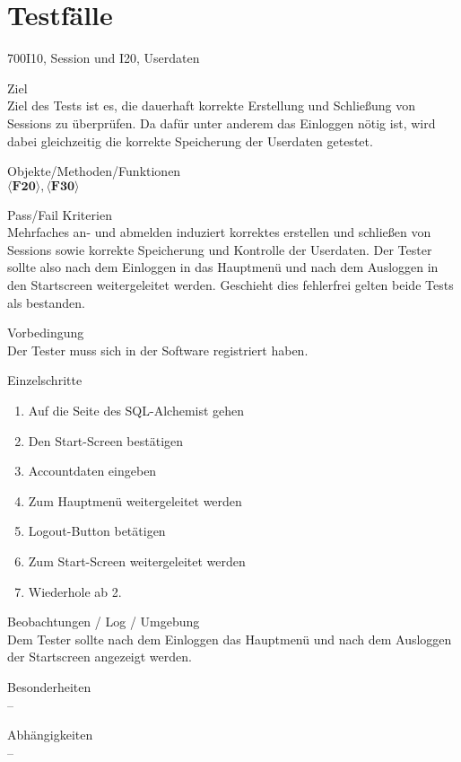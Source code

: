\section{Testfälle}
\begin{testcase}{700}{I10, Session und I20, Userdaten}
\label{T700}
\item[Ziel]~\\
Ziel des Tests ist es, die dauerhaft korrekte Erstellung und Schließung von Sessions zu überprüfen. Da dafür unter anderem das Einloggen nötig ist, wird dabei gleichzeitig die korrekte Speicherung der Userdaten getestet.
\item[Objekte/Methoden/Funktionen]~\\
$\langle\textbf{F20}\rangle, \langle\textbf{F30}\rangle$
\item[Pass/Fail Kriterien]~\\
Mehrfaches an- und abmelden induziert korrektes erstellen und schließen von Sessions sowie korrekte Speicherung und Kontrolle der Userdaten. Der Tester sollte also nach dem Einloggen in das Hauptmenü und nach dem Ausloggen in den Startscreen weitergeleitet werden. Geschieht dies fehlerfrei gelten beide Tests als bestanden.
\item[Vorbedingung]~\\
Der Tester muss sich in der Software registriert haben. 
\item[Einzelschritte]~\\
\begin{enumerate}
	\item Auf die Seite des SQL-Alchemist gehen\\
	\item Den Start-Screen bestätigen\\
	\item Accountdaten eingeben\\
	\item Zum Hauptmenü weitergeleitet werden\\
	\item Logout-Button betätigen\\
	\item Zum Start-Screen weitergeleitet werden\\
	\item Wiederhole ab 2. \\
\end{enumerate}
\item[Beobachtungen / Log / Umgebung]~\\ 
Dem Tester sollte nach dem Einloggen das Hauptmenü und nach dem Ausloggen der Startscreen angezeigt werden.
\item[Besonderheiten]~\\
--
\item[Abhängigkeiten]~\\
--
\end{testcase}


